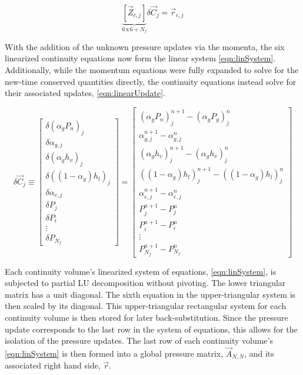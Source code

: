 \begin{equation}
\label{eqn:linSystem}
\underbrace{\left[\vec{Z}_{c, j}\right]}_{6\, \text{x}\, 6 + N_{f}} \delta \vec{C}_{j} = \vec{r}_{c,j}
\end{equation}

With the addition of the unknown pressure updates via the momenta, the six linearized continuity equations now form the linear system \eqref{eqn:linSystem}.
Additionally, while the momentum equations were fully expanded to solve for the new-time conserved quantities directly, the continuity equations instead solve for their associated updates, \eqref{eqn:linearUpdate}.

\begin{equation}
\label{eqn:linearUpdate}
\delta \vec{C}_{j} \equiv 
\begin{bmatrix}
\delta ( \alpha_{g} P_{n} )_j \\
\delta \alpha_{g, j} \\
\delta ( \alpha_{g} h_v )_j \\
\delta ( (1 - \alpha_{g} ) h_l )_j \\
\delta \alpha_{e,j} \\
\delta P_j \\ 
\delta P_i \\
\vdots \\
\delta P_{N_{f}}
\end{bmatrix}
=
\begin{bmatrix}
( \alpha_{g} P_{n})_{j}^{n+1} - (\alpha_{g} P_{g} )_{j}^{n} \\
\alpha^{n+1}_{g,j} - \alpha^{n}_{g,j} \\
( \alpha_{g} h_{v} )_{j}^{n+1} - ( \alpha_{g} h_{v} )_{j}^{n} \\
( ( 1 - \alpha_{g} ) h_{l} )_{j}^{n+1} - ( ( 1 - \alpha_{g} ) h_{l} )_{j}^{n} \\
\alpha^{n+1}_{e,j} - \alpha^{n}_{e,j} \\
 P_{j}^{n+1} - P_{j}^{n} \\
 P_{i}^{n+1} - P_{i}^{n} \\
 \vdots \\
 P_{N_{f}}^{n+1} - P_{N_{f}}^{n}
\end{bmatrix}
\end{equation}

Each continuity volume's linearized system of equations, \eqref{eqn:linSystem}, is subjected to partial LU decomposition without pivoting.
The lower triangular matrix has a unit diagonal.
The sixth equation in the upper-triangular system is then scaled by its diagonal.
This upper-triangular rectangular system for each continuity volume is then stored for later back-substitution.
Since the pressure update corresponds to the last row in the system of equations, this allows for the isolation of the pressure updates.
The last row of each continuity volume's \eqref{eqn:linSystem} is then formed into a global pressure matrix, $\vec{A}_{N,N}$, and its associated right hand side, $\vec{r}$.

